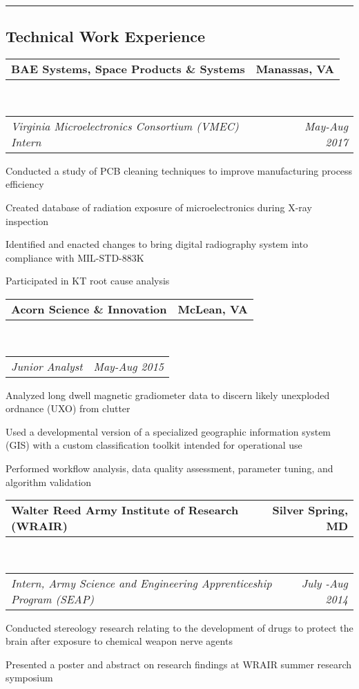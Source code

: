 \documentclass[10pt,letterpaper]{article}
\makeatletter
\newcommand{\headerrow}[2]
{\begin{tabular*}{\linewidth}{l@{\extracolsep{\fill}}r}
	#1 &
	#2 \\
\end{tabular*}}
\makeatother
\begin{document}
\hrule
\vspace{-0.4em}
\subsection*{Technical Work Experience}
\headerrow
		{\textbf{BAE Systems, Space Products \& Systems}}
		{\textbf{Manassas, VA}}
	\\
	\headerrow
		{\emph{Virginia Microelectronics Consortium (VMEC) Intern}}
		{\emph{May-Aug 2017}}
\begin{itemize*}
		\item Conducted a study of PCB cleaning techniques to improve manufacturing process efficiency
		\item Created database of radiation exposure of microelectronics during X-ray inspection
		\item Identified and enacted changes to bring digital radiography system into compliance with MIL-STD-883K
		\item Participated in KT root cause analysis
	\end{itemize*}
	\headerrow
		{\textbf{Acorn Science \& Innovation}}
		{\textbf{McLean, VA}}
	\\
	\headerrow
		{\emph{Junior Analyst}}
		{\emph{May-Aug 2015}}
	\begin{itemize*}
		\item Analyzed long dwell magnetic gradiometer data to
			discern likely unexploded ordnance (UXO) from clutter
		\item Used a developmental version of a specialized geographic information system (GIS) with 			a custom classification toolkit intended for operational use
		\item Performed workflow analysis, data
quality assessment, parameter tuning, and algorithm validation
	\end{itemize*}
	\headerrow
		{\textbf{Walter Reed Army Institute of Research (WRAIR)}}
		{\textbf{Silver Spring, MD}}
	\\
	\headerrow
		{\emph{Intern, Army Science and Engineering Apprenticeship Program (SEAP)}}
		{\emph{July -Aug 2014}}
	\begin{itemize*}
		\item Conducted stereology research relating to the development of drugs to protect the brain after exposure to chemical weapon nerve agents
		\item Presented a poster and abstract on research findings at WRAIR summer research symposium
	\end{itemize*}
	
\end{document}
